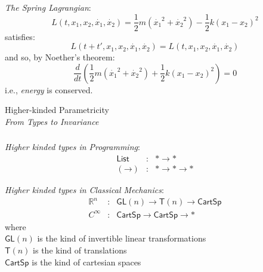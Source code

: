 \documentclass[xetex,serif,mathserif]{beamer}
\newenvironment{slide}[1]{\begin{frame}\frametitle{#1}}{\end{frame}}
\begin{document}
\begin{slide}{}
  \textcolor{titlered}{\emph{The Spring Lagrangian}}:
  \begin{displaymath}
    L(t, x_1, x_2, \dot{x_1}, \dot{x_2}) = \frac{1}{2}m(\dot{x_1}^2 + \dot{x_2}^2) - \frac{1}{2}k(x_1 - x_2)^2
  \end{displaymath}
  \quad satisfies:
  \begin{displaymath}
    L(t + t', x_1, x_2, \dot{x_1}, \dot{x_2}) = L(t, x_1, x_2, \dot{x_1}, \dot{x_2})
  \end{displaymath}
  \quad and so, by Noether’s theorem:
  \begin{displaymath}
    \frac{d}{dt}\left(\frac{1}{2}m(\dot{x_1}^2 + \dot{x_2}^2) + \frac{1}{2}k(x_1 - x_2)^2\right) = 0
  \end{displaymath}
  \quad\quad i.e., \emph{energy} is conserved.

\end{slide}

\begin{frame}
  \begin{center}
    {Higher-kinded Parametricity} \\
    \pause
    \textcolor{black!60}{\emph{From Types to Invariance}}
  \end{center}
\end{frame}

\newcommand{\sechead}[1]{\textcolor{titlered}{\emph{#1}}}

\begin{slide}{}
  \sechead{Higher kinded types in Programming}:
  \begin{displaymath}
    \begin{array}{lcl}
      \mathsf{List} & : & * \to * \\
      (\mathord\to) & : & * \to * \to *
    \end{array}
  \end{displaymath}

  \bigskip

  \sechead{Higher kinded types in Classical Mechanics}:
  \begin{displaymath}
    \begin{array}{lcl}
      \mathbb{R}^n & : & \mathsf{GL}(n) \to \mathsf{T}(n) \to \mathsf{CartSp} \\
      C^\infty & : & \mathsf{CartSp} \to \mathsf{CartSp} \to *
    \end{array}
  \end{displaymath}
  \quad where \\
  \quad\quad $\mathsf{GL}(n)$ is the kind of invertible linear transformations \\
  \quad\quad $\mathsf{T}(n)$ is the kind of translations \\
  \quad\quad $\mathsf{CartSp}$ is the kind of cartesian spaces
\end{slide}
\end{document}
